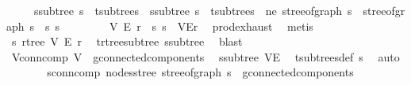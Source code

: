 \begin{isabellebody}
\ \ \ \ \ s{}{\isacharunderscore}{\kern0pt}subtree{\isacharcolon}{\kern0pt}\ {\isachardoublequoteopen}s{}\ {\isasymin}\ t{\isachardot}{\kern0pt}subtrees{\isachardoublequoteclose}\ \ s{}{\isacharunderscore}{\kern0pt}subtree{\isacharcolon}{\kern0pt}\ {\isachardoublequoteopen}s{}\ {\isasymin}\ t{\isachardot}{\kern0pt}subtrees{\isachardoublequoteclose}\ \ ne{\isacharcolon}{\kern0pt}\ {\isachardoublequoteopen}stree{\isacharunderscore}{\kern0pt}of{\isacharunderscore}{\kern0pt}graph\ s{}\ {\isasymnoteq}\ stree{\isacharunderscore}{\kern0pt}of{\isacharunderscore}{\kern0pt}graph\ s{}{\isachardoublequoteclose}\ \ s{}\ s{}\isanewline
\ \ \isamarkupfalse%
{\isacharminus}{\kern0pt}\isanewline
\ \ \ \ \isamarkupfalse%
\ V{}\ E{}\ r{}\ \ s{}{\isacharcolon}{\kern0pt}\ {\isachardoublequoteopen}s{}\ {\isacharequal}{\kern0pt}\ {\isacharparenleft}{\kern0pt}V{}{\isacharcomma}{\kern0pt}E{}{\isacharcomma}{\kern0pt}r{}{\isacharparenright}{\kern0pt}{\isachardoublequoteclose}\ \isamarkupfalse%
\ prod{\isachardot}{\kern0pt}exhaust\ \isamarkupfalse%
\ metis\isanewline
\ \ \ \ \isamarkupfalse%
\ \isamarkupfalse%
\ s{}{\isacharcolon}{\kern0pt}\ rtree\ V{}\ E{}\ r{}\ \isamarkupfalse%
\ t{\isachardot}{\kern0pt}rtree{\isacharunderscore}{\kern0pt}subtree\ s{}{\isacharunderscore}{\kern0pt}subtree\ \isamarkupfalse%
\ blast\isanewline
\ \ \ \ \isamarkupfalse%
\ V{}{\isacharunderscore}{\kern0pt}conn{\isacharunderscore}{\kern0pt}comp{\isacharcolon}{\kern0pt}\ {\isachardoublequoteopen}V{}\ {\isasymin}\ g{\isacharprime}{\kern0pt}{\isachardot}{\kern0pt}connected{\isacharunderscore}{\kern0pt}components{\isachardoublequoteclose}\ \isamarkupfalse%
\ s{}{\isacharunderscore}{\kern0pt}subtree\ VE{\isacharprime}{\kern0pt}\ \isamarkupfalse%
\ t{\isachardot}{\kern0pt}subtrees{\isacharunderscore}{\kern0pt}def\ s{}\ \isamarkupfalse%
\ auto\isanewline
\ \ \ \ \isamarkupfalse%
\ \isamarkupfalse%
\ s{}{\isacharunderscore}{\kern0pt}conn{\isacharunderscore}{\kern0pt}comp{\isacharcolon}{\kern0pt}\ {\isachardoublequoteopen}nodes{\isacharunderscore}{\kern0pt}stree\ {\isacharparenleft}{\kern0pt}stree{\isacharunderscore}{\kern0pt}of{\isacharunderscore}{\kern0pt}graph\ s{}{\isacharparenright}{\kern0pt}\ {\isasymin}\ g{\isacharprime}{\kern0pt}{\isachardot}{\kern0pt}connected{\isacharunderscore}{\kern0pt}components{\isachardoublequoteclose}\ \isamarkupfalse%

\end{isabellebody}
